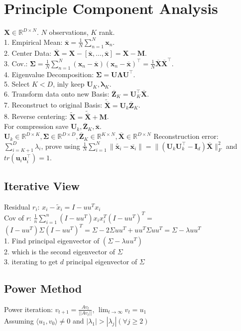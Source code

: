 \section{Principle Component Analysis}
$\mathbf{X} \in \mathbb{R}^{D \times N}$. $N$ observations, $K$ rank.\\
1. Empirical Mean: $\overline{\mathbf{x}} = \frac{1}{N} \sum_{n=1}^N \mathbf{x}_n$.\\
2. Center Data: $\overline{\mathbf{X}} = \mathbf{X} - [\overline{\mathbf{x}}, \ldots, \overline{\mathbf{x}}] = \mathbf{X} - \mathbf{M}$.\\
3. Cov.: $\boldsymbol{\Sigma} = \frac{1}{N	} \sum_{n=1}^N (\mathbf{x}_n - \overline{\mathbf{x}}) (\mathbf{x}_n - \overline{\mathbf{x}})^\top = \frac{1}{N} \overline{\mathbf{X}}\overline{\mathbf{X}}^\top$.\\
4. Eigenvalue Decomposition: $\boldsymbol{\Sigma} = \mathbf{U} \boldsymbol{\Lambda} \mathbf{U}^\top$.\\
5. Select $K < D$, inly keep $\mathbf{U}_K, \boldsymbol{\lambda}_K$.\\
6. Transform data onto new Basis: $\overline{\mathbf{Z}}_K = \mathbf{U}_K^\top \overline{\mathbf{X}}$.\\
7. Reconstruct to original Basis: $\tilde{\overline{\mathbf{X}}} = \mathbf{U}_k \overline{\mathbf{Z}}_K$.\\
8. Reverse centering: $\tilde{\mathbf{X}} = \tilde{\overline{\mathbf{X}}} + \mathbf{M}$.\\
For compression save $\mathbf{U}_k, \overline{\mathbf{Z}}_K, \overline{\mathbf{x}}$.\\
$\mathbf{U}_k \in \mathbb{R}^{D \times K}, \boldsymbol{\Sigma} \in \mathbb{R}^{D \times D}, \overline{\mathbf{Z}}_K \in \mathbb{R}^{K \times N}, \overline{\mathbf{X}} \in \mathbb{R}^{D \times N}$
Reconstruction error: $\sum_{i=K+1}^D \lambda_i$, prove using $\frac{1}{N} \sum_{i=1}^N \|\tilde{\mathbf{x}_i} - \overline{\mathbf{x}_i}\| = \|(\mathbf{U}_k\mathbf{U}_k^\top - \mathbf{I}_d)\overline{\mathbf{X}}\|^2_F$ and $tr(\mathbf{u}_i\mathbf{u}_i^\top)=1$.
\subsection*{Iterative View}
Residual $r_i$: $x_i - \tilde{x}_i = I - uu^T  x_i$\\
Cov of $r$:  $\frac{1}{n} \sum_{i=1}^n (I-uu^T)x_i x_i^T (I-uu^T)^T =$ \\
$(I-uu^T) \Sigma (I-uu^T)^T = \Sigma - 2\Sigma u u^T + u u^T \Sigma u u ^T = \Sigma - \lambda uu^T$ \\
1. Find principal eigenvector of $(\Sigma - \lambda u u^T)$\\
2. which is the second eigenvector of $\Sigma$\\
3. iterating to get $d$ principal eigenvector of $\Sigma$

\subsection*{Power Method}
Power iteration: $v_{t+1} = \frac{Av_t}{||Av_t||}$, $\lim_{t \rightarrow \infty} v_t = u_1$\\
Assuming $\langle u_1, v_0 \rangle \not = 0$ and $|\lambda_1| > |\lambda_j| (\forall j \geq 2)$
